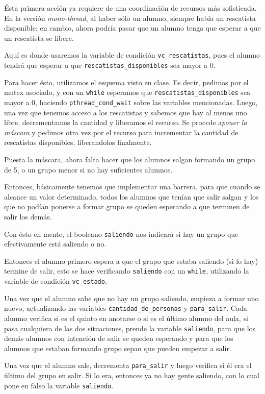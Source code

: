 \documentclass[a4paper]{article}
\begin{document}
Ésta primera acción ya requiere de una coordinación de recursos más
sofisticada. En la versión \textit{mono-thread}, al haber sólo un alumno,
siempre había un rescatista disponible; en cambio, ahora podría pasar que un
alumno tenga que esperar a que un rescatista se libere.

Aquí es donde usaremos la variable de condición \verb|vc_rescatistas|,
pues el alumno tendrá que esperar a que \verb|rescatistas_disponibles|
sea mayor a $0$.

Para hacer ésto, utilizamos el esquema visto en clase. Es decir, pedimos por
el mutex asociado, y con un \verb|while| esperamos que
\verb|rescatistas_disponibles| sea mayor a $0$, haciendo
\verb|pthread_cond_wait| sobre las variables mencionadas. Luego, una vez
que tenemos acceso a los rescatistas y sabemos que hay al menos uno libre,
decrementamos la cantidad y liberamos el recurso. Se procede a\textit{poner
la máscara} y pedimos otra vez por el recurso para incrementar la cantidad
de rescatistas disponibles, liberandolos finalmente.

Puesta la máscara, ahora falta hacer que los alumnos salgan formando un
grupo de 5, o un grupo menor si no hay suficientes alumnos.

Entonces, básicamente tenemos que implementar una barrera, para que cuando
se alcance un valor determinado, todos los alumnos que tenían que salir
salgan y los que no podían ponerse a formar grupo se queden esperando a que
terminen de salir los demás.

Con ésto en mente, el booleano \verb|saliendo| nos indicará si hay un grupo
que efectivamente está saliendo o no.

Entonces el alumno primero espera a que el grupo que estaba saliendo (si lo
hay) termine de salir, esto se hace verificando \verb|saliendo| con un
\verb|while|, utilizando la variable de condición \verb|vc_estado|. 

Una vez que el alumno sabe que no hay un grupo saliendo, empieza a formar
uno nuevo, actualizando las variables \verb|cantidad_de_personas| y
\verb|para_salir|. Cada alumno verifica si es el quinto en anotarse o si es
el último alumno del aula, si pasa cualquiera de las dos situaciones,
prende la variable \verb|saliendo|, para que los demás alumnos con
intención de salir se queden esperando y para que los alumnos que estaban
formando grupo sepan que pueden empezar a salir.

Una vez que el alumno sale, decrementa \verb|para_salir| y luego
verifica si él era el último del grupo en salir. Si lo era, entonces ya no
hay gente saliendo, con lo cual pone en falso la variable \verb|saliendo|.
\end{document}
